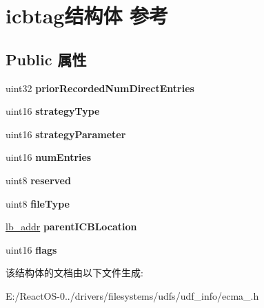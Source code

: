 \hypertarget{structicbtag}{}\section{icbtag结构体 参考}
\label{structicbtag}
\subsection*{Public 属性}
\begin{DoxyCompactItemize}
\item 
\mbox{\label{structicbtag_a0b8349b7fdc77faa8ba6fc979559035a}} 
uint32 {\bfseries prior\+Recorded\+Num\+Direct\+Entries}
\item 
\mbox{\label{structicbtag_ac98a1418de3d8b2342819bc77b2d32fc}} 
uint16 {\bfseries strategy\+Type}
\item 
\mbox{\label{structicbtag_a900193e68e8a352fb8ab2751e39cee62}} 
uint16 {\bfseries strategy\+Parameter}
\item 
\mbox{\label{structicbtag_a43c90dae688831494f5e495a2f437a96}} 
uint16 {\bfseries num\+Entries}
\item 
\mbox{\label{structicbtag_a4c6f1182ee09460e053502238fbbe2b4}} 
uint8 {\bfseries reserved}
\item 
\mbox{\label{structicbtag_a83f405d9a7844fc0e452c6a40965643c}} 
uint8 {\bfseries file\+Type}
\item 
\mbox{\label{structicbtag_a7b97fa24e6ee47d67527952fccb61f1d}} 
\hyperlink{structlb__addr}{lb\+\_\+addr} {\bfseries parent\+I\+C\+B\+Location}
\item 
\mbox{\label{structicbtag_afc0638621acecaf8336bceb0bf881e10}} 
uint16 {\bfseries flags}
\end{DoxyCompactItemize}


该结构体的文档由以下文件生成\+:\begin{DoxyCompactItemize}
\item 
E\+:/\+React\+O\+S-\/0../drivers/filesystems/udfs/udf\+\_\+info/ecma\+\_.\+h\end{DoxyCompactItemize}
